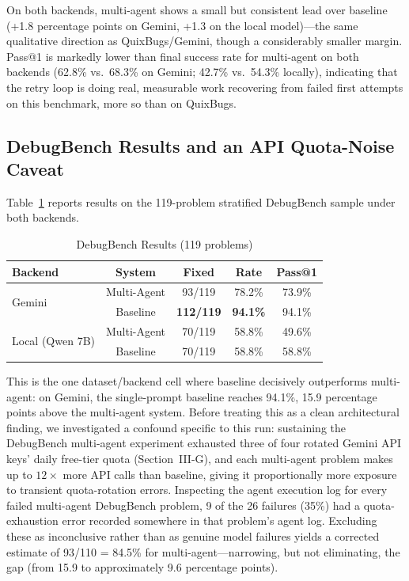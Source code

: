 \documentclass[conference]{IEEEtran}
\begin{document}
On both backends, multi-agent shows a small but consistent lead over baseline (+1.8 percentage points on Gemini, +1.3 on the local model)---the same qualitative direction as QuixBugs/Gemini, though a considerably smaller margin. Pass@1 is markedly lower than final success rate for multi-agent on both backends (62.8\% vs.\ 68.3\% on Gemini; 42.7\% vs.\ 54.3\% locally), indicating that the retry loop is doing real, measurable work recovering from failed first attempts on this benchmark, more so than on QuixBugs.

\subsection{DebugBench Results and an API Quota-Noise Caveat}
\label{sec:debugbench-results}
Table~\ref{tab:debugbench} reports results on the 119-problem stratified DebugBench sample under both backends.

\begin{table}[htbp]
\caption{DebugBench Results (119 problems)}
\label{tab:debugbench}
\centering
\small
\begin{tabular}{lcccc}
\toprule
\textbf{Backend} & \textbf{System} & \textbf{Fixed} & \textbf{Rate} & \textbf{Pass@1} \\
\midrule
\multirow{2}{*}{Gemini} & Multi-Agent & 93/119 & 78.2\% & 73.9\% \\
 & Baseline & \textbf{112/119} & \textbf{94.1\%} & 94.1\% \\
\multirow{2}{*}{Local (Qwen 7B)} & Multi-Agent & 70/119 & 58.8\% & 49.6\% \\
 & Baseline & 70/119 & 58.8\% & 58.8\% \\
\bottomrule
\end{tabular}
\end{table}

This is the one dataset/backend cell where baseline decisively outperforms multi-agent: on Gemini, the single-prompt baseline reaches 94.1\%, 15.9 percentage points above the multi-agent system. Before treating this as a clean architectural finding, we investigated a confound specific to this run: sustaining the DebugBench multi-agent experiment exhausted three of four rotated Gemini API keys' daily free-tier quota (Section~III-G), and each multi-agent problem makes up to $12\times$ more API calls than baseline, giving it proportionally more exposure to transient quota-rotation errors. Inspecting the agent execution log for every failed multi-agent DebugBench problem, 9 of the 26 failures (35\%) had a quota-exhaustion error recorded somewhere in that problem's agent log. Excluding these as inconclusive rather than as genuine model failures yields a corrected estimate of 93/110 = 84.5\% for multi-agent---narrowing, but not eliminating, the gap (from 15.9 to approximately 9.6 percentage points).
\end{document}
